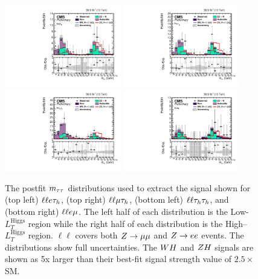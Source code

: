 \begin{figure}[h!]
 \begin{center}
  \includegraphics[width=0.45\textwidth]{higgs_to_taus_vh/plots/zh/llet_postfit.pdf}
  \includegraphics[width=0.45\textwidth]{higgs_to_taus_vh/plots/zh/llmt_postfit.pdf}
  \includegraphics[width=0.45\textwidth]{higgs_to_taus_vh/plots/zh/lltt_postfit.pdf}
  \includegraphics[width=0.45\textwidth]{higgs_to_taus_vh/plots/zh/llem_postfit.pdf}
 \end{center}
 \caption{The postfit $m_{\tau\tau}$ distributions used to extract the signal shown
  for (top left) $\ell\ell e\tau_{h}$, (top right) $\ell\ell\mu\tau_{h}$, 
  (bottom left) $\ell\ell\tau_{h}\tau_{h}$, and (bottom right) $\ell\ell e\mu$.
  The left half of each distribution is the Low-$L_{T}^{\textrm{Higgs}}$ region
  while the right half of each distribution is the High--$L_{T}^{\textrm{Higgs}}$ region.
  $\ell\ell$ covers both $Z \to \mu\mu$ and $Z \to ee$ events.
  The distributions show full uncertainties.
  The $WH$ and $ZH$ signals are shown as 5x larger than their best-fit
  signal strength value of $2.5 \times$ SM.
 }
 \label{fig:zh_results_svFitLLXX}
\end{figure}


